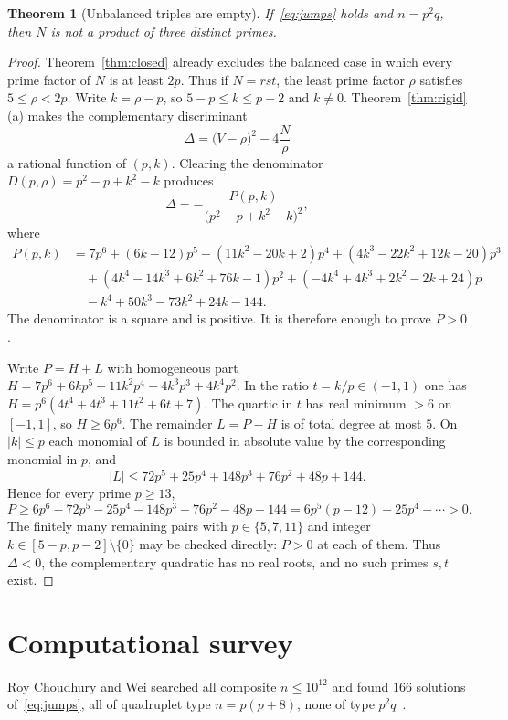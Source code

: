 \documentclass[11pt,reqno]{amsart}
\newtheorem{theorem}{Theorem}
\theoremstyle{definition}
\begin{document}
\begin{theorem}[Unbalanced triples are empty]
\label{thm:R1}
If~\eqref{eq:jumps} holds and \(n=p^2q\), then \(N\) is not a product of three distinct primes.
\end{theorem}

\begin{proof}
Theorem~\ref{thm:closed} already excludes the balanced case in which every prime factor of \(N\) is at least \(2p\). Thus if \(N=rst\), the least prime factor \(\rho\) satisfies \(5\le\rho<2p\). Write \(k=\rho-p\), so \(5-p\le k\le p-2\) and \(k\neq 0\). Theorem~\ref{thm:rigid}(a) makes the complementary discriminant
\[
\Delta=\bigl(V-\rho\bigr)^2-4\frac{N}{\rho}
\]
a rational function of \((p,k)\). Clearing the denominator \(D(p,\rho)=p^2-p+k^2-k\) produces
\[
\Delta=-\frac{P(p,k)}{\bigl(p^2-p+k^2-k\bigr)^2},
\]
where
\begin{align*}
P(p,k)&=7p^6+(6k-12)p^5+(11k^2-20k+2)p^4+(4k^3-22k^2+12k-20)p^3\\
&\quad+(4k^4-14k^3+6k^2+76k-1)p^2+(-4k^4+4k^3+2k^2-2k+24)p\\
&\quad-k^4+50k^3-73k^2+24k-144.
\end{align*}
The denominator is a square and is positive. It is therefore enough to prove \(P>0\).

Write \(P=H+L\) with homogeneous part \(H=7p^6+6kp^5+11k^2p^4+4k^3p^3+4k^4p^2\). In the ratio \(t=k/p\in(-1,1)\) one has \(H=p^6(4t^4+4t^3+11t^2+6t+7)\). The quartic in \(t\) has real minimum \(>6\) on \([-1,1]\), so \(H\ge 6p^6\). The remainder \(L=P-H\) is of total degree at most \(5\). On \(|k|\le p\) each monomial of \(L\) is bounded in absolute value by the corresponding monomial in \(p\), and
\[
|L|\le 72p^5+25p^4+148p^3+76p^2+48p+144.
\]
Hence for every prime \(p\ge 13\),
\[
P\ge 6p^6-72p^5-25p^4-148p^3-76p^2-48p-144=6p^5(p-12)-25p^4-\cdots>0.
\]
The finitely many remaining pairs with \(p\in\{5,7,11\}\) and integer \(k\in[5-p,p-2]\setminus\{0\}\) may be checked directly: \(P>0\) at each of them. Thus \(\Delta<0\), the complementary quadratic has no real roots, and no such primes \(s,t\) exist.
\end{proof}

\section{Computational survey}

\label{sec:comp}

Roy Choudhury and Wei searched all composite \(n\le 10^{12}\) and found \(166\) solutions of~\eqref{eq:jumps}, all of quadruplet type \(n=p(p+8)\), none of type \(p^2q\)~\cite{RCW2026}.
\end{document}
